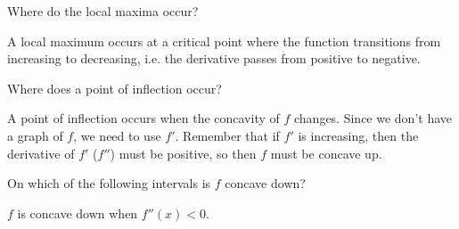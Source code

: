 \documentclass{ximera}
\begin{document}
\begin{example}
  \begin{problem}
    Where do the local maxima occur?
    \begin{selectAll}
    \end{selectAll}
    \begin{hint}
      A local maximum occurs at a critical point where the function
      transitions from increasing to decreasing, i.e. the derivative
      passes from positive to negative. %
    \end{hint}
  \end{problem}
  
  \begin{problem}
    Where does a point of inflection occur?
    \begin{selectAll}
\end{selectAll}
    
    \begin{hint}
      A point of inflection occurs when the concavity of $f$ changes. Since we don't have a graph of $f$, we need to use $f'$.  Remember that if $f'$ is increasing, then the derivative of $f'$ ($f''$) must be positive, so then $f$ must be concave up. %
    \end{hint}
    
  \end{problem}

  \begin{problem}
    On which of the following intervals is $f$ concave down?
    \begin{selectAll}
    \end{selectAll}
    
    \begin{hint}
      $f$ is concave down when $f''(x)<0$.  %
    \end{hint}
  \end{problem}
  
  
\end{example}
\end{document}

